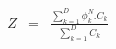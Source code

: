 
\begin{eqnarray*}
Z & = &  
\frac{\displaystyle\sum_{k=1}^{D} \phi_k^N.C_k} 
     {\displaystyle\sum_{k=1}^{D} C_k} \\
\end{eqnarray*}
